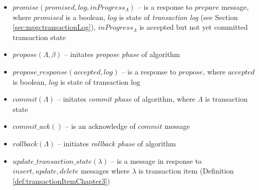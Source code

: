 \begin{definition}
\begin{itemize}
	\item $\mathit{promise(promised, log, inProgress_{\Lambda})}$ -- is a response to $\mathit{prepare}$ message, where $\mathit{promised}$ is a boolean, $\mathit{log}$ is state of \emph{transaction log} (see Section \ref{sec:mpp:transactionLog}), $\mathit{inProgress_{\Lambda}}$ is accepted but not yet committed transaction state 
	\item $\mathit{propose}(\Lambda, \beta)$ -- initates \emph{propose phase} of \mpt algorithm
	\item $\mathit{propose\_response}(accepted, log)$ -- is a response to $\mathit{propose}$, where $\mathit{accepted}$ is boolean, $\mathit{log}$ is state of transaction log 
	\item $\mathit{commit}(\Lambda)$ -- initates \emph{commit phase} of \mpt algorithm, where $\Lambda$ is transaction state 
	\item $\mathit{commit\_ack()}$ -- is an acknowledge of $\mathit{commit}$ message 
	\item $\mathit{rollback}(\Lambda)$ -- initiates \emph{rollback phase} of \mpt algorithm
	\item $\mathit{update\_transaction\_state}(\lambda)$ -- is a message in response to $\mathit{insert, update, delete}$ messages where $\lambda$ is transaction item (Definition \ref{def:transactionItemChapter3}) 
	\end{itemize}
\end{definition}



